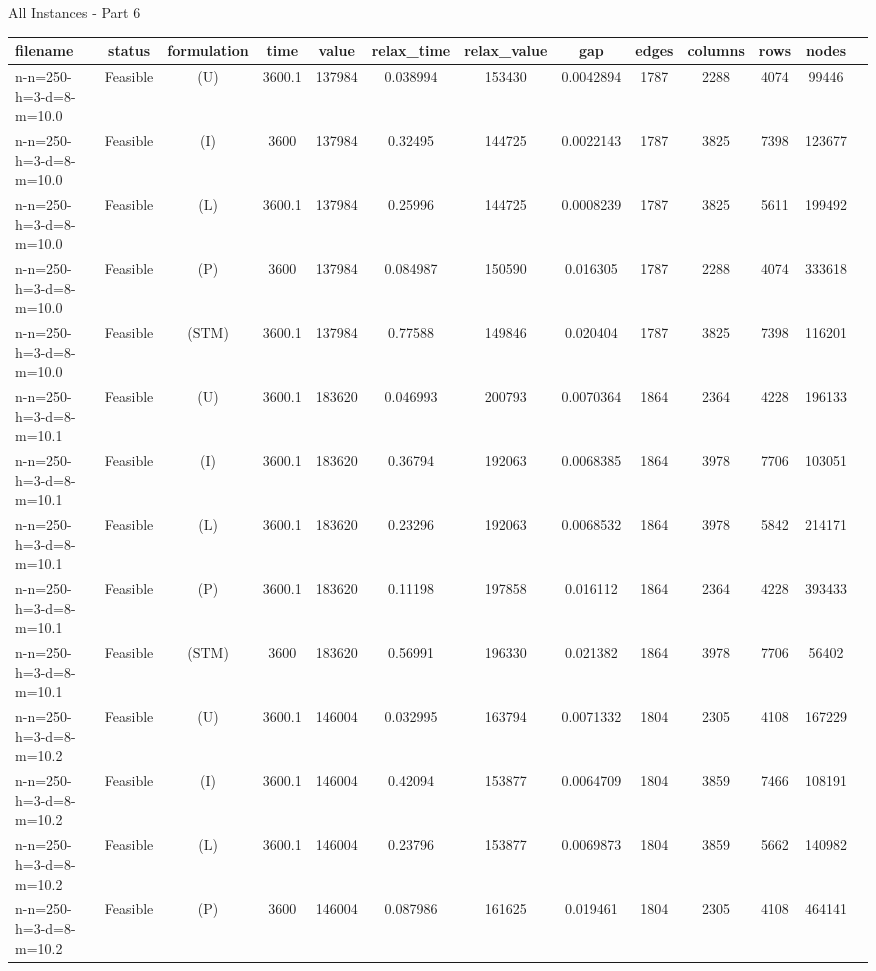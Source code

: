 \documentclass[landscape, a4paper]{article}
\newcommand{\STM}{\ensuremath{\mathrm{STM}}}
\newcommand{\Improved}{\ensuremath{\mathrm{I}}}
\newcommand{\Loose}{\ensuremath{\mathrm{L}}}
\newcommand{\Profit}{\ensuremath{\mathrm{P}}}
\newcommand{\Utility}{\ensuremath{\mathrm{U}}}
\begin{document}
\begin{center}
\newpage
All Instances - Part 6

\begin{tabular}{lcccccccccccc}
filename & status & formulation & time & value & relax\_time & relax\_value & gap & edges & columns & rows & nodes & \\
\hline
n-n=250-h=3-d=8-m=10.0 & Feasible & (\Utility) & 3600.1 & 137984 & 0.038994 & 153430 & 0.0042894 & 1787 & 2288 & 4074 & 99446 & \\
n-n=250-h=3-d=8-m=10.0 & Feasible & (\Improved) & 3600 & 137984 & 0.32495 & 144725 & 0.0022143 & 1787 & 3825 & 7398 & 123677 & \\
n-n=250-h=3-d=8-m=10.0 & Feasible & (\Loose) & 3600.1 & 137984 & 0.25996 & 144725 & 0.0008239 & 1787 & 3825 & 5611 & 199492 & \\
n-n=250-h=3-d=8-m=10.0 & Feasible & (\Profit) & 3600 & 137984 & 0.084987 & 150590 & 0.016305 & 1787 & 2288 & 4074 & 333618 & \\
n-n=250-h=3-d=8-m=10.0 & Feasible & (\STM) & 3600.1 & 137984 & 0.77588 & 149846 & 0.020404 & 1787 & 3825 & 7398 & 116201 & \\
n-n=250-h=3-d=8-m=10.1 & Feasible & (\Utility) & 3600.1 & 183620 & 0.046993 & 200793 & 0.0070364 & 1864 & 2364 & 4228 & 196133 & \\
n-n=250-h=3-d=8-m=10.1 & Feasible & (\Improved) & 3600.1 & 183620 & 0.36794 & 192063 & 0.0068385 & 1864 & 3978 & 7706 & 103051 & \\
n-n=250-h=3-d=8-m=10.1 & Feasible & (\Loose) & 3600.1 & 183620 & 0.23296 & 192063 & 0.0068532 & 1864 & 3978 & 5842 & 214171 & \\
n-n=250-h=3-d=8-m=10.1 & Feasible & (\Profit) & 3600.1 & 183620 & 0.11198 & 197858 & 0.016112 & 1864 & 2364 & 4228 & 393433 & \\
n-n=250-h=3-d=8-m=10.1 & Feasible & (\STM) & 3600 & 183620 & 0.56991 & 196330 & 0.021382 & 1864 & 3978 & 7706 & 56402 & \\
n-n=250-h=3-d=8-m=10.2 & Feasible & (\Utility) & 3600.1 & 146004 & 0.032995 & 163794 & 0.0071332 & 1804 & 2305 & 4108 & 167229 & \\
n-n=250-h=3-d=8-m=10.2 & Feasible & (\Improved) & 3600.1 & 146004 & 0.42094 & 153877 & 0.0064709 & 1804 & 3859 & 7466 & 108191 & \\
n-n=250-h=3-d=8-m=10.2 & Feasible & (\Loose) & 3600.1 & 146004 & 0.23796 & 153877 & 0.0069873 & 1804 & 3859 & 5662 & 140982 & \\
n-n=250-h=3-d=8-m=10.2 & Feasible & (\Profit) & 3600 & 146004 & 0.087986 & 161625 & 0.019461 & 1804 & 2305 & 4108 & 464141 & \\

\end{tabular}
\end{center}
\end{document}
